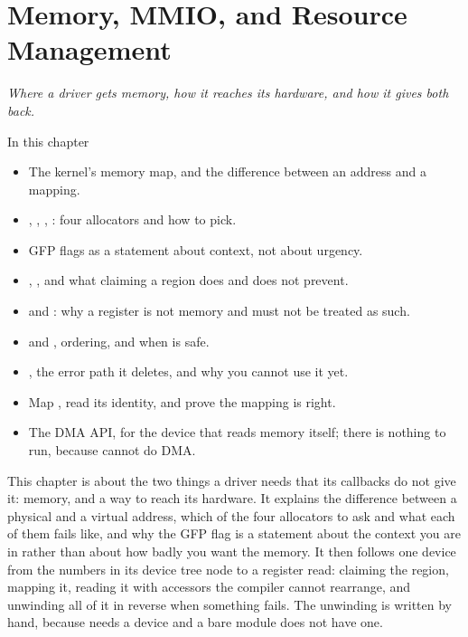 
\chapter{Memory, MMIO, and Resource Management}
\label{c6:ch}

{\large\itshape Where a driver gets memory, how it reaches its hardware, and how it gives both
back.\par}

\begin{chapterbox}{In this chapter}
\begin{itemize}
  \item The kernel's memory map, and the difference between an address and a mapping.
  \item {}, , , : four allocators and how
    to pick.
  \item GFP flags as a statement about context, not about urgency.
  \item {}, , and what claiming a region does and does not
    prevent.
  \item {} and : why a register is not memory and must not be treated as
    such.
  \item {} and , ordering, and when  is safe.
  \item {}, the error path it deletes, and why you cannot use it yet.
  \item Map , read its identity, and prove the mapping is right.
  \item The DMA API, for the device that reads memory itself; there is nothing to run, because
     cannot do DMA.
\end{itemize}
\end{chapterbox}

This chapter is about the two things a driver needs that its callbacks do not give it: memory, and
a way to reach its hardware. It explains the difference between a physical and a virtual address,
which of the four allocators to ask and what each of them fails like, and why the GFP flag is a
statement about the context you are in rather than about how badly you want the memory. It then
follows one device from the numbers in its device tree node to a register read: claiming the
region, mapping it, reading it with accessors the compiler cannot rearrange, and unwinding all of
it in reverse when something fails. The unwinding is written by hand, because  needs a
device and a bare module does not have one.

